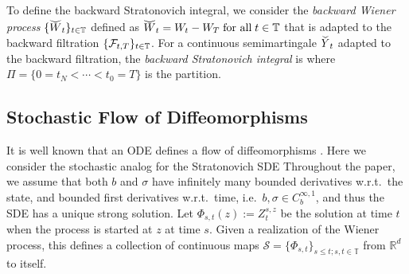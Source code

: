 \documentclass[twoside]{article}
\begin{document}
To define the backward Stratonovich integral, we consider the \emph{backward Wiener process} $\{\widecheck{W}_t\}_{t \in \mathbb{T}}$ defined as $\widecheck{W}_t = W_t - W_T\; \text{for all} \; t \in \mathbb{T}$ that is adapted to the backward filtration $\{\mathcal{F}_{t, T}\}_{t \in \mathbb{T}}$. For a continuous semimartingale $\widecheck{Y}_t$ adapted to the backward filtration, the \emph{backward Stratonovich integral} is
where $\Pi = \{0 = t_N < \cdots < t_0 = T \}$ is the partition. 

\subsection{Stochastic Flow of Diffeomorphisms}
\label{subsec:bg_stochastic_flow}
It is well known that an ODE defines a flow of diffeomorphisms \cite{arnold1978ordinary}. Here we consider the stochastic analog for the Stratonovich SDE
Throughout the paper, we assume that both $b$ and $\sigma$ have infinitely many bounded derivatives w.r.t.\ the state, and bounded first derivatives w.r.t.\ time, i.e.\ $b, \sigma \in C^{\infty, 1}_b$, and thus the SDE has a unique strong solution.
 Let $\Phi_{s, t}(z) := Z^{s, z}_t$ be the solution at time $t$ when the process is started at $z$ at time $s$. 
Given a realization of the Wiener process, this defines a collection of continuous maps $\mathcal{S} = \{ \Phi_{s, t}\}_{s \le t; s, t \in \mathbb{T}}$ from $\mathbb{R}^d$ to itself. 
\end{document}
